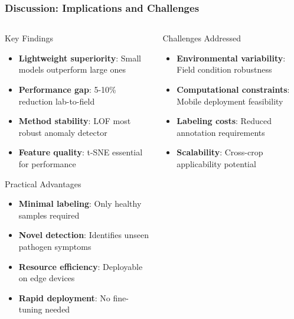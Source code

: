 \documentclass[aspectratio=43]{beamer}
\begin{document}
\begin{frame}
    \frametitle{Discussion: Implications and Challenges}
    
    \begin{columns}
        \begin{column}{0.5\textwidth}
            \begin{block}{Key Findings}
                \begin{itemize}
                    \item \textbf{Lightweight superiority}: Small models outperform large ones
                    \item \textbf{Performance gap}: 5-10\% reduction lab-to-field
                    \item \textbf{Method stability}: LOF most robust anomaly detector
                    \item \textbf{Feature quality}: t-SNE essential for performance
                \end{itemize}
            \end{block}
            
            \begin{exampleblock}{Practical Advantages}
                \begin{itemize}
                    \item \textbf{Minimal labeling}: Only healthy samples required
                    \item \textbf{Novel detection}: Identifies unseen pathogen symptoms
                    \item \textbf{Resource efficiency}: Deployable on edge devices
                    \item \textbf{Rapid deployment}: No fine-tuning needed
                \end{itemize}
            \end{exampleblock}
        \end{column}
        
        \begin{column}{0.5\textwidth}
            \begin{alertblock}{Challenges Addressed}
                \begin{itemize}
                    \item \textbf{Environmental variability}: Field condition robustness
                    \item \textbf{Computational constraints}: Mobile deployment feasibility
                    \item \textbf{Labeling costs}: Reduced annotation requirements
                    \item \textbf{Scalability}: Cross-crop applicability potential
                \end{itemize}
            \end{alertblock}
            

\end{column}
\end{columns}
\end{frame}
\end{document}
